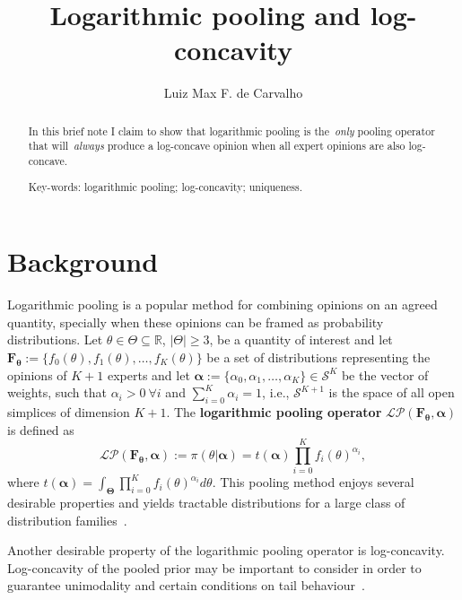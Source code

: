 \documentclass[a4paper, notitlepage, 10pt]{article}
\title{\vspace{-9ex}\centering \bf Logarithmic pooling and log-concavity}
\author{
Luiz Max F. de Carvalho\\
}
\begin{document}
\maketitle

\begin{abstract}
In this brief note I claim to show that logarithmic pooling is the~\textit{only} pooling operator that will~\textit{always} produce a log-concave opinion when all expert opinions are also log-concave.

Key-words: logarithmic pooling; log-concavity; uniqueness. 
\end{abstract}

\section*{Background}

Logarithmic pooling is a popular method for combining opinions on an agreed quantity, specially when these opinions can be framed as probability distributions.
Let $\theta \in \Theta \subseteq \mathbb{R}$, $|\Theta| \geq 3$,  be a quantity of interest and let $\mathbf{F_\theta} := \{f_0(\theta), f_1(\theta), \ldots, f_K(\theta)\}$ be a set of distributions representing the opinions of $K + 1$ experts and let $\boldsymbol\alpha :=\{\alpha_0, \alpha_1, \ldots, \alpha_K \} \in \mathcal{S}^K$ be the vector of weights, such that $\alpha_i > 0\: \forall i$ and $\sum_{i=0}^K \alpha_i = 1$, i.e., $\mathcal{S}^{K + 1}$ is the space of all open simplices of dimension $K + 1$.
The \textbf{logarithmic pooling operator} $\mathcal{LP}(\mathbf{F_\theta}, \boldsymbol\alpha)$ is defined as
\begin{equation}
\label{eq:logpool}
 \mathcal{LP}(\mathbf{F_\theta}, \boldsymbol\alpha) :=  \pi(\theta | \boldsymbol\alpha) = t(\boldsymbol\alpha) \prod_{i=0}^K f_i(\theta)^{\alpha_i},
\end{equation}
where $t(\boldsymbol\alpha) = \int_{\boldsymbol\Theta}\prod_{i=0}^K f_i(\theta)^{\alpha_i}d\theta$.
This pooling method enjoys several desirable properties and yields tractable distributions for a large class of distribution families~\citep{genest1984,genest1986A}.

Another desirable property of the logarithmic pooling operator is log-concavity.
Log-concavity of the pooled prior may be important to consider in order to guarantee unimodality and certain conditions on tail behaviour~\citep{Bagnoli2005}.
\end{document}
